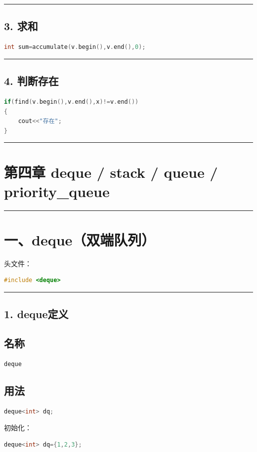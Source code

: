 \documentclass[10pt,twocolumn]{extarticle}
\begin{document}
\noindent\rule{\linewidth}{0.4pt}

\subsection{3. 求和}
\begin{lstlisting}[language=C++]
int sum=accumulate(v.begin(),v.end(),0);
\end{lstlisting}

\noindent\rule{\linewidth}{0.4pt}

\subsection{4. 判断存在}
\begin{lstlisting}[language=C++]
if(find(v.begin(),v.end(),x)!=v.end())
{
    cout<<"存在";
}
\end{lstlisting}

\noindent\rule{\linewidth}{0.4pt}

\section{第四章 deque / stack / queue / priority\_queue}

\noindent\rule{\linewidth}{0.4pt}

\section{一、deque（双端队列）}

头文件：
\begin{lstlisting}[language=C++]
#include <deque>
\end{lstlisting}

\noindent\rule{\linewidth}{0.4pt}

\subsection{1. deque定义}

\subsection{名称}
\begin{lstlisting}[language=C++]
deque
\end{lstlisting}

\subsection{用法}
\begin{lstlisting}[language=C++]
deque<int> dq;
\end{lstlisting}
初始化：
\begin{lstlisting}[language=C++]
deque<int> dq={1,2,3};
\end{lstlisting}
\end{document}
